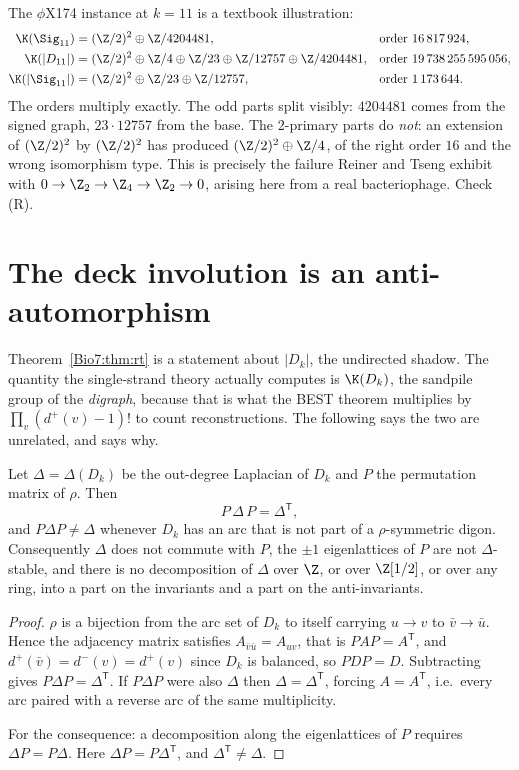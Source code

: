 The $\phi$X174 instance at $k=11$ is a textbook illustration:
\[
\begin{aligned}
  \K(\Sig_{11})   &= (\Z/2)^2\oplus\Z/4204481, &&\text{order } 16\,817\,924,\\
  \K(|D_{11}|)    &= (\Z/2)^2\oplus\Z/4\oplus\Z/23\oplus\Z/12757\oplus\Z/4204481,
                  &&\text{order } 19\,738\,255\,595\,056,\\
  \K(|\Sig_{11}|) &= (\Z/2)^2\oplus\Z/23\oplus\Z/12757, &&\text{order } 1\,173\,644 .
\end{aligned}
\]
The orders multiply exactly. The odd parts split visibly: $4204481$ comes from the signed
graph, $23\cdot 12757$ from the base. The $2$-primary parts do \emph{not}: an extension of
$(\Z/2)^2$ by $(\Z/2)^2$ has produced $(\Z/2)^2\oplus\Z/4$, of the right order $16$ and the
wrong isomorphism type. This is precisely the failure Reiner and Tseng exhibit with
$0\to\Z_2\to\Z_4\to\Z_2\to 0$, arising here from a real bacteriophage. Check (R).

\section{The deck involution is an anti-automorphism}

Theorem~\ref{Bio7:thm:rt} is a statement about $|D_k|$, the undirected shadow. The quantity the
single-strand theory actually computes is $\K(D_k)$, the sandpile group of the
\emph{digraph}, because that is what the BEST theorem multiplies by
$\prod_v(d^+(v)-1)!$ to count reconstructions. The following says the two are unrelated, and
says why.

\begin{theorem}\label{Bio7:thm:anti}
Let $\Delta=\Delta(D_k)$ be the out-degree Laplacian of $D_k$ and $P$ the permutation matrix
of $\rho$. Then
\[
  P\,\Delta\,P=\Delta^{\mathsf T},
\]
and $P\Delta P\ne\Delta$ whenever $D_k$ has an arc that is not part of a $\rho$-symmetric
digon. Consequently $\Delta$ does not commute with $P$, the $\pm1$ eigenlattices of $P$ are
not $\Delta$-stable, and there is no decomposition of $\Delta$ over $\Z$, or over
$\Z[1/2]$, or over any ring, into a part on the invariants and a part on the anti-invariants.
\end{theorem}

\begin{proof}
$\rho$ is a bijection from the arc set of $D_k$ to itself carrying $u\to v$ to
$\bar v\to\bar u$. Hence the adjacency matrix satisfies $A_{\bar v\bar u}=A_{uv}$, that is
$PAP=A^{\mathsf T}$, and $d^+(\bar v)=d^-(v)=d^+(v)$ since $D_k$ is balanced, so $PDP=D$.
Subtracting gives $P\Delta P=\Delta^{\mathsf T}$. If $P\Delta P$ were also $\Delta$ then
$\Delta=\Delta^{\mathsf T}$, forcing $A=A^{\mathsf T}$, i.e.\ every arc paired with a reverse
arc of the same multiplicity.

For the consequence: a decomposition along the eigenlattices of $P$ requires
$\Delta P=P\Delta$. Here $\Delta P=P\Delta^{\mathsf T}$, and $\Delta^{\mathsf T}\ne\Delta$.
\end{proof}

